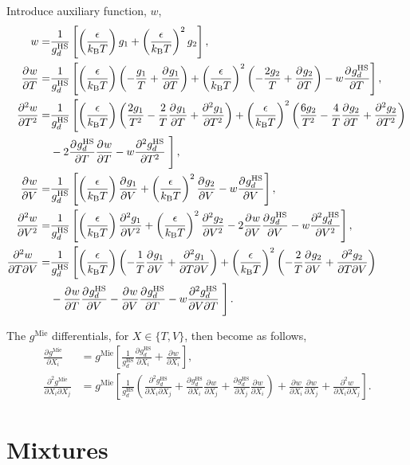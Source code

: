 \documentclass[english]{../thermomemo/thermomemo}
\newcommand*{\pd}[3][]{\frac{\partial^{#1}#2}{\partial{#3}^{#1}}}%
\newcommand*{\pdc}[3]{\frac{\partial^{2}#1}{\partial{#2}\partial{#3}}}%
\newcommand*{\lb}{\left(}
\newcommand*{\rb}{\right)}
\newcommand{\mie}{\text{Mie}\xspace}
\newcommand{\hs}{\text{HS}\xspace}
\newcommand{\kB}{\ensuremath{k_{\text{B}}}\xspace}
\begin{document}
Introduce auxiliary function, $w$,
\begin{align}
  \label{eq:w_diff}
  w =& \frac{1}{g^\hs_d}\left[\lb \frac{\epsilon}{\kB T} \rb g_1 + \lb \frac{\epsilon}{\kB T} \rb^2 g_2\right],\\
  \pd{w}{T} =& \frac{1}{g^\hs_d}\left[\lb \frac{\epsilon}{\kB T} \rb \lb -\frac{g_1}{T} +  \pd{g_1}{T} \rb + \lb \frac{\epsilon}{\kB T} \rb^2\lb-\frac{2g_2}{T}  + \pd{g_2}{T}\rb  -w \pd{g^\hs_d}{T} \right],\\
  \pd[2]{w}{T} =& \frac{1}{ g^\hs_d}\left[\lb \frac{\epsilon}{\kB T} \rb \lb \frac{2g_1}{T^2} -\frac{2}{T}\pd{g_1}{T} +  \pd[2]{g_1}{T} \rb + \lb \frac{\epsilon}{\kB T} \rb^2 \lb \frac{6g_2}{T^2}  - \frac{4}{T}\pd{g_2}{T} + \pd[2]{g_2}{T}\rb \right.\nonumber \\ &- 2\pd{g^\hs_d}{T}\pd{w}{T} - w\pd[2]{g^\hs_d}{T}  \left. \vphantom{\lb \pd{g^\hs_d}{T} \rb^2}\right],\\
  \pd{w}{V} =& \frac{1}{g^\hs_d}\left[\lb \frac{\epsilon}{\kB T} \rb \pd{g_1}{V} + \lb \frac{\epsilon}{\kB T} \rb^2\pd{g_2}{V} -w\pd{g^\hs_d}{V} \right],\\
  \pd[2]{w}{V} =& \frac{1}{g^\hs_d}\left[ \lb \frac{\epsilon}{\kB T} \rb \pd[2]{g_1}{V} + \lb \frac{\epsilon}{\kB T} \rb^2\pd[2]{g_2}{V} - 2\pd{w}{V}\pd{g^\hs_d}{V} - w\pd[2]{g^\hs_d}{V}\right],\\
  \pdc{w}{T}{V} =& \frac{1}{ g^\hs_d}\left[\lb \frac{\epsilon}{\kB T} \rb \lb -\frac{1}{T}\pd{g_1}{V} +  \pdc{g_1}{T}{V} \rb + \lb \frac{\epsilon}{\kB T} \rb^2\lb-\frac{2}{T}\pd{g_2}{V}  + \pdc{g_2}{T}{V}\rb \right. \nonumber \\&  - \pd{w}{T}\pd{g^\hs_d}{V} - \pd{w}{V}\pd{g^\hs_d}{T} - w\pdc{g^\hs_d}{V}{T} \left. \vphantom{\lb \pd{g^\hs_d}{T} \rb^2}\right].
\end{align}

The $g^\mie$ differentials, for $X \in \{T, V \}$, then become as
follows,
\begin{align}
  \label{eq:g_mie_diff}
  \pd{g^\mie}{X_i} &= g^\mie \left[\frac{1}{g^\hs_d}\pd{g^\hs_d}{X_i} + \pd{w}{X_i} \right],\\
  \pdc{g^\mie}{X_i}{X_j} &= g^\mie \left[\frac{1}{g^\hs_d}\lb \pdc{g^\hs_d}{X_i}{X_j} + \pd{g^\hs_d}{X_i}\pd{w}{X_j} + \pd{g^\hs_d}{X_j}\pd{w}{X_i} \rb + \pd{w}{X_i}\pd{w}{X_j} + \pdc{w}{X_i}{X_j} \right].
\end{align}

\section{Mixtures}
\end{document}
